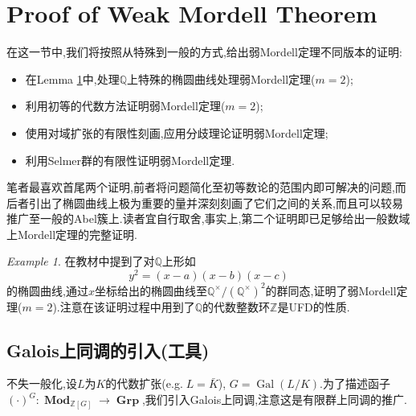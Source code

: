 \documentclass[12pt,A4paper,oneside,reqno]{amsart}
\numberwithin{equation}{section}
\theoremstyle{definition}
\theoremstyle{plain}
\theoremstyle{plain}
\numberwithin{equation}{section}
\theoremstyle{remark}
\newtheorem{eg}[theorem]{Example}
\newcommand{\Mod}{\operatorname{\textbf{Mod}}}
\newcommand{\Gal}{\operatorname{Gal}}
\newcommand{\Grp}{\operatorname{\textbf{Grp}}}
\begin{document}
\section{Proof of Weak Mordell Theorem}
在这一节中,我们将按照从特殊到一般的方式,给出弱Mordell定理不同版本的证明:
\begin{itemize}
	\item 在Lemma \ref{eg:weakMT}中,处理$\mathbb{Q}$上特殊的椭圆曲线处理弱Mordell定理($m=2$);
	\item 利用初等的代数方法证明弱Mordell定理($m=2$);
	\item 使用对域扩张的有限性刻画,应用分歧理论证明弱Mordell定理;
	\item 利用Selmer群的有限性证明弱Mordell定理.
\end{itemize}
笔者最喜欢首尾两个证明,前者将问题简化至初等数论的范围内即可解决的问题,而后者引出了椭圆曲线上极为重要的量并深刻刻画了它们之间的关系,而且可以较易推广至一般的Abel簇上.读者宜自行取舍,事实上,第二个证明即已足够给出一般数域上Mordell定理的完整证明.
\begin{eg}\label{eg:weakMT}
	在教材\cite{fermat2013dream}中提到了对$\mathbb{Q}$上形如
	\begin{equation}\label{eq:ellsplit}
	y^2=(x-a)(x-b)(x-c)
	\end{equation}
	的椭圆曲线,通过$x$坐标给出的椭圆曲线至$\mathbb{Q}^{\times}/(\mathbb{Q}^{\times})^2$的群同态,证明了弱Mordell定理($m=2$).注意在该证明过程中用到了$\mathbb{Q}$的代数整数环$\mathbb{Z}$是UFD的性质.
\end{eg}
\subsection{Galois上同调的引入(工具)}\phantom{1}

不失一般化,设$L$为$K$的代数扩张(e.g.$\;L=\bar{K}$), $G=\Gal(L/K)$.为了描述函子$(\cdot)^G: \Mod_{\mathbb{Z}[G]} \longrightarrow \Grp$,我们引入Galois上同调,注意这是有限群上同调的推广.
\end{document}
